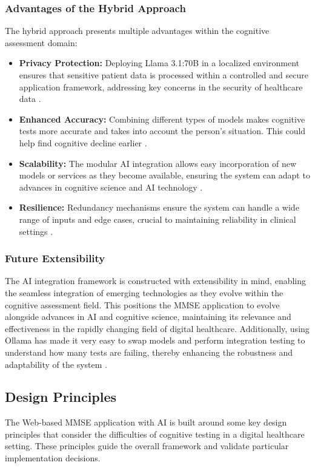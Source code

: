 \subsubsection{Advantages of the Hybrid Approach}
The hybrid approach presents multiple advantages within the cognitive assessment domain:
\begin{itemize}
\item \textbf{Privacy Protection:} Deploying Llama 3.1:70B in a localized environment ensures that sensitive patient data is processed within a controlled and secure application framework, addressing key concerns in the security of healthcare data \cite{Krutz2017}.
\item \textbf{Enhanced Accuracy:} Combining different types of models makes cognitive tests more accurate and takes into account the person's situation. This could help find cognitive decline earlier \cite{Grassi2019}.
\item \textbf{Scalability:} The modular AI integration allows easy incorporation of new models or services as they become available, ensuring the system can adapt to advances in cognitive science and AI technology \cite{Zygouris2017}.
\item \textbf{Resilience:} Redundancy mechanisms ensure the system can handle a wide range of inputs and edge cases, crucial to maintaining reliability in clinical settings \cite{Bauer2012}.
\end{itemize}

\subsubsection{Future Extensibility}
The AI integration framework is constructed with extensibility in mind, enabling the seamless integration of emerging technologies as they evolve within the cognitive assessment field. This positions the MMSE application to evolve alongside advances in AI and cognitive science, maintaining its relevance and effectiveness in the rapidly changing field of digital healthcare. Additionally, using Ollama has made it very easy to swap models and perform integration testing to understand how many tests are failing, thereby enhancing the robustness and adaptability of the system \cite{Ollama2024, Zygouris2017}.

\subsection{Design Principles}
The Web-based MMSE application with AI is built around some key design principles that consider the difficulties of cognitive testing in a digital healthcare setting. These principles guide the overall framework and validate particular implementation decisions.

